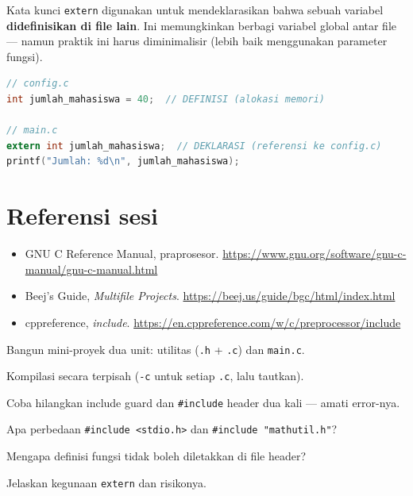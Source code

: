 \documentclass[../main.tex]{subfiles}
\begin{document}
Kata kunci \texttt{extern} digunakan untuk mendeklarasikan bahwa sebuah variabel \textbf{didefinisikan di file lain}. Ini memungkinkan berbagi variabel global antar file --- namun praktik ini harus diminimalisir (lebih baik menggunakan parameter fungsi).

\begin{lstlisting}[language=C,caption=Penggunaan \texttt{extern}]
// config.c
int jumlah_mahasiswa = 40;  // DEFINISI (alokasi memori)

// main.c
extern int jumlah_mahasiswa;  // DEKLARASI (referensi ke config.c)
printf("Jumlah: %d\n", jumlah_mahasiswa);
\end{lstlisting}

\section{Referensi sesi}
\begin{itemize}[leftmargin=*]
  \item GNU C Reference Manual, praprosesor. \url{https://www.gnu.org/software/gnu-c-manual/gnu-c-manual.html}
  \item Beej's Guide, \textit{Multifile Projects}. \url{https://beej.us/guide/bgc/html/index.html}
  \item cppreference, \textit{include}. \url{https://en.cppreference.com/w/c/preprocessor/include}
\end{itemize}

\begin{aktivitas}
  \item Bangun mini-proyek dua unit: utilitas (\texttt{.h} + \texttt{.c}) dan \texttt{main.c}.
  \item Kompilasi secara terpisah (\texttt{-c} untuk setiap \texttt{.c}, lalu tautkan).
  \item Coba hilangkan include guard dan \texttt{\#include} header dua kali --- amati error-nya.
\end{aktivitas}

\begin{latihan}
  \item Apa perbedaan \texttt{\#include <stdio.h>} dan \texttt{\#include "mathutil.h"}?
  \item Mengapa definisi fungsi tidak boleh diletakkan di file header?
  \item Jelaskan kegunaan \texttt{extern} dan risikonya.
\end{latihan}
\end{document}
